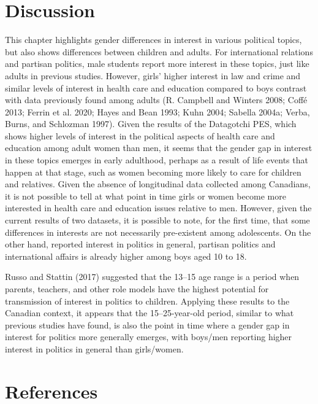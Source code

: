 \documentclass[
  letterpaper,
  DIV=11,
  numbers=noendperiod]{scrreprt}
\begin{document}
\hypertarget{discussion}{%
\section{Discussion}\label{discussion}}

This chapter highlights gender differences in interest in various
political topics, but also shows differences between children and
adults. For international relations and partisan politics, male students
report more interest in these topics, just like adults in previous
studies. However, girls' higher interest in law and crime and similar
levels of interest in health care and education compared to boys
contrast with data previously found among adults (R. Campbell and
Winters 2008; Coffé 2013; Ferrin et al. 2020; Hayes and Bean 1993; Kuhn
2004; Sabella 2004a; Verba, Burns, and Schlozman 1997). Given the
results of the Datagotchi PES, which shows higher levels of interest in
the political aspects of health care and education among adult women
than men, it seems that the gender gap in interest in these topics
emerges in early adulthood, perhaps as a result of life events that
happen at that stage, such as women becoming more likely to care for
children and relatives. Given the absence of longitudinal data collected
among Canadians, it is not possible to tell at what point in time girls
or women become more interested in health care and education issues
relative to men. However, given the current results of two datasets, it
is possible to note, for the first time, that some differences in
interests are not necessarily pre-existent among adolescents. On the
other hand, reported interest in politics in general, partisan politics
and international affairs is already higher among boys aged 10 to 18.

Russo and Stattin (2017) suggested that the 13--15 age range is a period
when parents, teachers, and other role models have the highest potential
for transmission of interest in politics to children. Applying these
results to the Canadian context, it appears that the 15--25-year-old
period, similar to what previous studies have found, is also the point
in time where a gender gap in interest for politics more generally
emerges, with boys/men reporting higher interest in politics in general
than girls/women.

\hypertarget{references-2}{%
\section{References}\label{references-2}}
\end{document}
